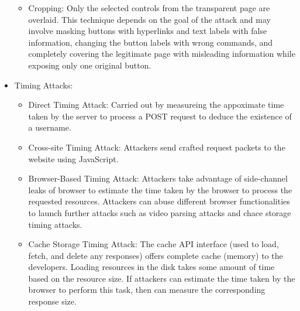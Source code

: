 \begin{itemize}
\begin{itemize}
        \item Cropping: Only the selected controls from the transparent page are overlaid. This technique depends on the goal of the attack and may involve masking buttons with hyperlinks and text labels with false information, changing the button labels with wrong commands, and completely covering the legitimate page with misleading information while exposing only one original button.
    \end{itemize}
    \item Timing Attacks:
    \begin{itemize}
        \item Direct Timing Attack: Carried out by measureing the appoximate time taken by the server to process a POST request to deduce the existence of a username.
        \item Cross-site Timing Attack: Attackers send crafted request packets to the website using JavaScript.
        \item Browser-Based Timing Attack: Attackers take advantage of side-channel leaks of browser to estimate the time taken by the browser to process the requested resources. Attackers can abuse different browser functionalities to launch further attacks such as video parsing attacks and chace storage timing attacks.
        \item Cache Storage Timing Attack: The cache API interface (used to load, fetch, and delete any responses) offers complete cache (memory) to the developers. Loading resources in the disk takes some amount of time based on the resource size. If attackers can estimate the time taken by the browser to perform this task, then can measure the corresponding response size.
    \end{itemize} 
\end{itemize}
